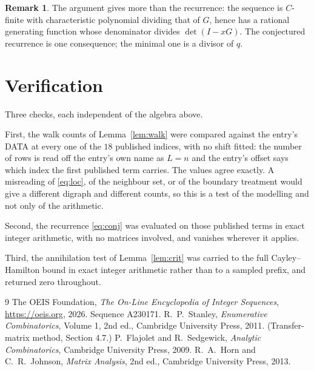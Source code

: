 \documentclass[11pt,a4paper]{article}
\theoremstyle{plain}
\theoremstyle{definition}
\newtheorem{remark}[theorem]{Remark}
\begin{document}
\begin{remark}
The argument gives more than the recurrence: the sequence is $C$-finite with characteristic
polynomial dividing that of $G$, hence has a rational generating function whose denominator
divides $\det(I-xG)$. The conjectured recurrence is one consequence; the minimal one is a
divisor of $q$.
\end{remark}

\section{Verification}

Three checks, each independent of the algebra above.

First, the walk counts of Lemma~\ref{lem:walk} were compared against the entry's DATA at
every one of the $18$ published indices, with no shift fitted: the number of rows is
read off the entry's own name as $L=n$ and the entry's offset says which index the first
published term carries. The values agree exactly. A misreading of \eqref{eq:loc}, of the
neighbour set, or of the boundary treatment would give a different digraph and different
counts, so this is a test of the modelling and not only of the arithmetic.

Second, the recurrence \eqref{eq:conj} was evaluated on those published terms in exact
integer arithmetic, with no matrices involved, and vanishes wherever it applies.

Third, the annihilation test of Lemma~\ref{lem:crit} was carried to the full
Cayley--Hamilton bound in exact integer arithmetic rather than to a sampled prefix, and
returned zero throughout.

\begin{thebibliography}{9}
 The OEIS Foundation, \emph{The On-Line Encyclopedia of Integer
Sequences}, \url{https://oeis.org}, 2026. Sequence A230171.
 R.~P.~Stanley, \emph{Enumerative Combinatorics}, Volume 1, 2nd ed.,
Cambridge University Press, 2011. (Transfer-matrix method, Section 4.7.)
 P.~Flajolet and R.~Sedgewick, \emph{Analytic Combinatorics}, Cambridge
University Press, 2009.
 R.~A.~Horn and C.~R.~Johnson, \emph{Matrix Analysis}, 2nd ed., Cambridge
University Press, 2013.
\end{thebibliography}
\end{document}
